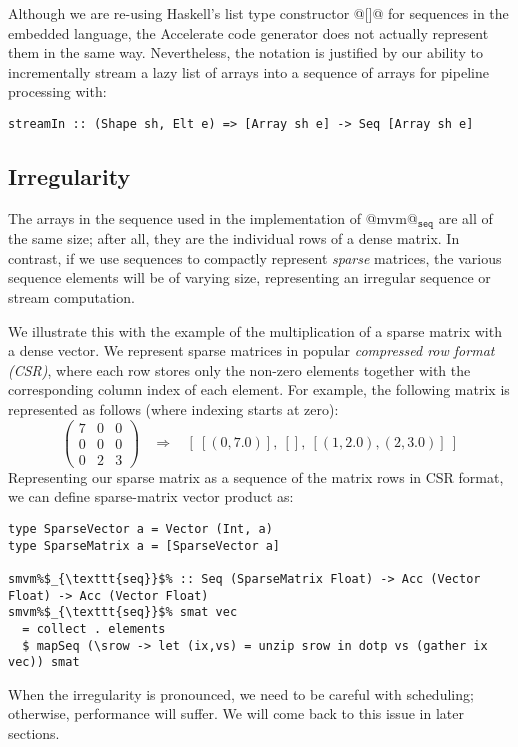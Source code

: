 
Although we are re-using Haskell's list type constructor @[]@ for sequences in the embedded language, the Accelerate code generator does not actually represent them in the same way. Nevertheless, the notation is justified by our ability to incrementally stream a lazy list of arrays into a sequence of arrays for pipeline processing with:
%
\begin{lstlisting}
streamIn :: (Shape sh, Elt e) => [Array sh e] -> Seq [Array sh e]
\end{lstlisting}

\subsection{Irregularity}

The arrays in the sequence used in the implementation of @mvm@$_{\texttt{seq}}$ are all of the same size; after all, they are the individual rows of a dense matrix. In contrast, if we use sequences to compactly represent \emph{sparse} matrices, the various sequence elements will be of varying size, representing an irregular sequence or stream computation.

We illustrate this with the example of the multiplication of a sparse matrix with
a dense vector. We represent sparse matrices in popular \emph{compressed row format (CSR)},
where each row stores only the non-zero elements together with the corresponding
column index of each element. For example, the following matrix is represented
as follows (where indexing starts at zero):
%
\[
\left(
\begin{array}{ccc}
  7 & 0 & 0 \\
  0 & 0 & 0 \\
  0 & 2 & 3
\end{array} \right)
~~~~ \Rightarrow
~~~~ [~[(0,7.0)],~[],~[(1,2.0),(2,3.0)]~]
\]
%
Representing our sparse matrix as a sequence of the matrix rows in CSR format,
we can define sparse-matrix vector product as:
%
\begin{lstlisting}
type SparseVector a = Vector (Int, a)
type SparseMatrix a = [SparseVector a]

smvm%$_{\texttt{seq}}$% :: Seq (SparseMatrix Float) -> Acc (Vector Float) -> Acc (Vector Float)
smvm%$_{\texttt{seq}}$% smat vec
  = collect . elements
  $ mapSeq (\srow -> let (ix,vs) = unzip srow in dotp vs (gather ix vec)) smat
\end{lstlisting}
%
When the irregularity is pronounced, we need to be careful with scheduling; otherwise, performance will suffer. We will come back to this issue in later sections.

